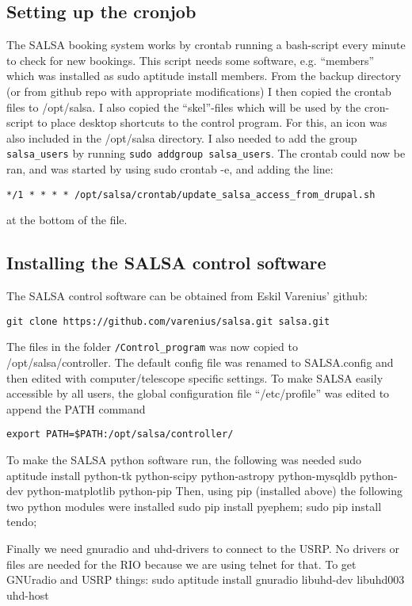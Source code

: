 \subsection{Setting up the cronjob}
The SALSA booking system works by crontab running a bash-script every minute to
check for new bookings. This script needs some software, e.g. “members” which
was installed as sudo aptitude install members. From the backup directory (or
from github repo with appropriate modifications) I then copied the crontab
files to /opt/salsa.  I also copied the “skel”-files which will be used by the
cron-script to place desktop shortcuts to the control program. For this, an
icon was also included in the /opt/salsa directory. I also needed to add the
group \verb!salsa_users! by running \verb!sudo addgroup salsa_users!.  The crontab could
now be ran, and was started by using sudo crontab -e, and adding the line:
\begin{verbatim}
*/1 * * * * /opt/salsa/crontab/update_salsa_access_from_drupal.sh
\end{verbatim}
at the bottom of the file.



\subsection{Installing the SALSA control software}
The SALSA control software can be obtained from Eskil Varenius’ github:
\begin{verbatim}
git clone https://github.com/varenius/salsa.git salsa.git
\end{verbatim}
The files in the folder \verb!/Control_program! was now copied to
/opt/salsa/controller. The default config file was renamed to SALSA.config and
then edited with computer/telescope specific settings. To make SALSA easily
accessible by all users, the global configuration file “/etc/profile” was
edited to append the PATH command 
\begin{verbatim}
export PATH=$PATH:/opt/salsa/controller/
\end{verbatim}

To make the SALSA python software run, the following was needed
sudo aptitude install python-tk python-scipy python-astropy python-mysqldb python-dev python-matplotlib python-pip
Then, using pip (installed above) the following two python modules were installed
sudo pip install pyephem;
sudo pip install tendo;

Finally we need gnuradio and uhd-drivers to connect to the USRP. No drivers or
files are needed for the RIO because we are using telnet for that. To get
GNUradio and USRP things: sudo aptitude install gnuradio libuhd-dev libuhd003
uhd-host

